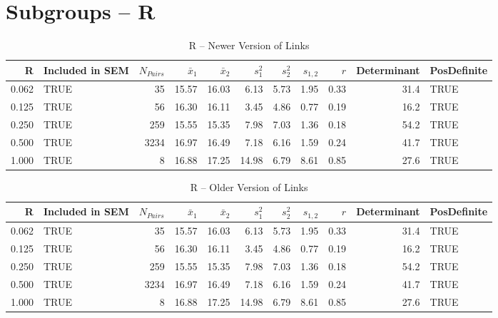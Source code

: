 \documentclass{article}\usepackage[]{graphicx}\usepackage[]{color}
\begin{document}
\section{Subgroups --  R }%
\begin{table}[ht]
\centering
\begin{tabular}{rlrrrrrrrrl}
  \hline
R & Included in SEM & $N_{Pairs}$ & $\bar{x}_1$ & $\bar{x}_2$ & $s_1^2$ & $s_2^2$ & $s_{1,2}$ & $r$ & Determinant & PosDefinite \\ 
  \hline
0.062 & TRUE & 35 & 15.57 & 16.03 & 6.13 & 5.73 & 1.95 & 0.33 & 31.4 & TRUE \\ 
  0.125 & TRUE & 56 & 16.30 & 16.11 & 3.45 & 4.86 & 0.77 & 0.19 & 16.2 & TRUE \\ 
  0.250 & TRUE & 259 & 15.55 & 15.35 & 7.98 & 7.03 & 1.36 & 0.18 & 54.2 & TRUE \\ 
  0.500 & TRUE & 3234 & 16.97 & 16.49 & 7.18 & 6.16 & 1.59 & 0.24 & 41.7 & TRUE \\ 
  1.000 & TRUE & 8 & 16.88 & 17.25 & 14.98 & 6.79 & 8.61 & 0.85 & 27.6 & TRUE \\ 
   \hline
\end{tabular}
\caption{R -- Newer Version of Links} 
\end{table}
\begin{table}[ht]
\centering
\begin{tabular}{rlrrrrrrrrl}
  \hline
R & Included in SEM & $N_{Pairs}$ & $\bar{x}_1$ & $\bar{x}_2$ & $s_1^2$ & $s_2^2$ & $s_{1,2}$ & $r$ & Determinant & PosDefinite \\ 
  \hline
0.062 & TRUE & 35 & 15.57 & 16.03 & 6.13 & 5.73 & 1.95 & 0.33 & 31.4 & TRUE \\ 
  0.125 & TRUE & 56 & 16.30 & 16.11 & 3.45 & 4.86 & 0.77 & 0.19 & 16.2 & TRUE \\ 
  0.250 & TRUE & 259 & 15.55 & 15.35 & 7.98 & 7.03 & 1.36 & 0.18 & 54.2 & TRUE \\ 
  0.500 & TRUE & 3234 & 16.97 & 16.49 & 7.18 & 6.16 & 1.59 & 0.24 & 41.7 & TRUE \\ 
  1.000 & TRUE & 8 & 16.88 & 17.25 & 14.98 & 6.79 & 8.61 & 0.85 & 27.6 & TRUE \\ 
   \hline
\end{tabular}
\caption{R -- Older Version of Links} 
\end{table}
\newpage 
\end{document}
